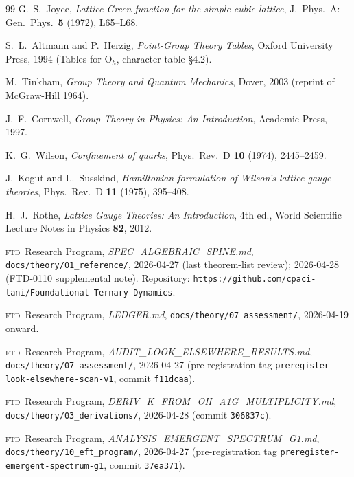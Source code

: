 \documentclass[11pt,reqno]{amsart}
\theoremstyle{plain}
\theoremstyle{definition}
\theoremstyle{remark}
\numberwithin{equation}{section}
\newcommand{\Ohgrp}{\mathrm{O}_h}
\newcommand{\FTD}{\textsc{ftd}}
\begin{document}
\begin{thebibliography}{99}
G.~S.\ Joyce, \emph{Lattice Green function for the simple cubic
lattice}, J.~Phys.~A: Gen.~Phys.~\textbf{5} (1972), L65--L68.


S.~L.\ Altmann and P.\ Herzig, \emph{Point-Group Theory Tables},
Oxford University Press, 1994 (Tables for $\Ohgrp$, character table
\S 4.2).

M.~Tinkham, \emph{Group Theory and Quantum Mechanics}, Dover, 2003
(reprint of McGraw-Hill 1964).

J.~F.\ Cornwell, \emph{Group Theory in Physics: An Introduction},
Academic Press, 1997.


K.~G.\ Wilson, \emph{Confinement of quarks},
Phys.~Rev.~D \textbf{10} (1974), 2445--2459.

J.~Kogut and L.~Susskind, \emph{Hamiltonian formulation of Wilson's
lattice gauge theories},
Phys.~Rev.~D \textbf{11} (1975), 395--408.

H.~J.\ Rothe, \emph{Lattice Gauge Theories: An Introduction}, 4th ed.,
World Scientific Lecture Notes in Physics \textbf{82}, 2012.


\FTD\ Research Program, \emph{SPEC\_ALGEBRAIC\_SPINE.md},
\texttt{docs/theory/01\_reference/}, 2026-04-27 (last theorem-list
review); 2026-04-28 (FTD-0110 supplemental note). Repository:
\texttt{https://github.com/cpaci-tani/Foundational-Ternary-Dynamics}.

\FTD\ Research Program, \emph{LEDGER.md},
\texttt{docs/theory/07\_assessment/}, 2026-04-19 onward.

\FTD\ Research Program, \emph{AUDIT\_LOOK\_ELSEWHERE\_RESULTS.md},
\texttt{docs/theory/07\_assessment/}, 2026-04-27 (pre-registration
tag \texttt{preregister-look-elsewhere-scan-v1}, commit
\texttt{f11dcaa}).

\FTD\ Research Program, \emph{DERIV\_K\_FROM\_OH\_A1G\_MULTIPLICITY.md},
\texttt{docs/theory/03\_derivations/}, 2026-04-28
(commit \texttt{306837c}).

\FTD\ Research Program, \emph{ANALYSIS\_EMERGENT\_SPECTRUM\_G1.md},
\texttt{docs/theory/10\_eft\_program/}, 2026-04-27 (pre-registration
tag \texttt{preregister-emergent-spectrum-g1}, commit
\texttt{37ea371}).


\end{thebibliography}
\end{document}

